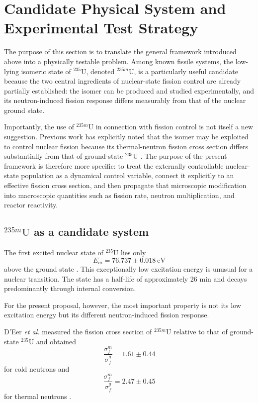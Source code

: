 \section{Candidate Physical System and Experimental Test Strategy}
\label{sec:candidate_system}

The purpose of this section is to translate the general framework introduced above into a physically testable problem. Among known fissile systems, the low-lying isomeric state of $^{235}\mathrm{U}$, denoted $^{235m}\mathrm{U}$, is a particularly useful candidate because the two central ingredients of nuclear-state fission control are already partially established: the isomer can be produced and studied experimentally, and its neutron-induced fission response differs measurably from that of the nuclear ground state.

Importantly, the use of $^{235m}\mathrm{U}$ in connection with fission control is not itself a new suggestion. Previous work has explicitly noted that the isomer may be exploited to control nuclear fission because its thermal-neutron fission cross section differs substantially from that of ground-state $^{235}\mathrm{U}$ \cite{deer1988,liu2022}. The purpose of the present framework is therefore more specific: to treat the externally controllable nuclear-state population as a dynamical control variable, connect it explicitly to an effective fission cross section, and then propagate that microscopic modification into macroscopic quantities such as fission rate, neutron multiplication, and reactor reactivity.

\subsection{$^{235m}\mathrm{U}$ as a candidate system}

The first excited nuclear state of $^{235}\mathrm{U}$ lies only
\begin{equation}
E_m = 76.737 \pm 0.018\ \mathrm{eV}
\end{equation}
above the ground state \cite{ponce2018}. This exceptionally low excitation energy is unusual for a nuclear transition. The state has a half-life of approximately 26 min and decays predominantly through internal conversion.

For the present proposal, however, the most important property is not its low excitation energy but its different neutron-induced fission response.

D'Eer \textit{et al.} measured the fission cross section of $^{235m}\mathrm{U}$ relative to that of ground-state $^{235}\mathrm{U}$ and obtained
\begin{equation}
\frac{\sigma_f^m}{\sigma_f^g}=1.61\pm0.44
\end{equation}
for cold neutrons and
\begin{equation}
\frac{\sigma_f^m}{\sigma_f^g}=2.47\pm0.45
\end{equation}
for thermal neutrons \cite{deer1988}.

